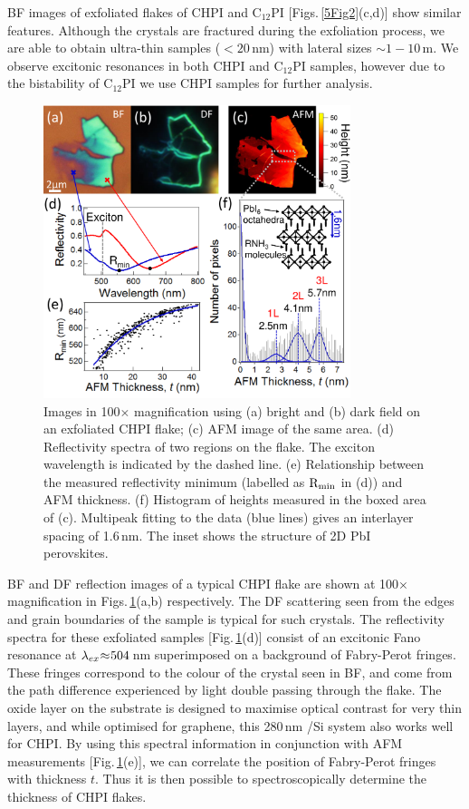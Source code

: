 BF images of exfoliated flakes of CHPI and C$_{12}$PI [Figs.\,\ref{5Fig2}(c,d)] show similar features. Although the crystals are fractured during the exfoliation process, we are able to obtain ultra-thin samples ($<20$\,nm) with lateral sizes $\sim1-10\,$\textmu m. We observe excitonic resonances in both CHPI and C$_{12}$PI samples, however due to the bistability of C$_{12}$PI we use CHPI samples for further analysis.
\begin{figure}[h!]
\centering
\includegraphics[width=0.8\textwidth]{Fig3}
\caption{Images in 100$\times$ magnification using (a) bright and (b) dark field on an exfoliated CHPI flake; (c) AFM image of the same area. (d) Reflectivity spectra of two regions on the flake. The exciton wavelength is indicated by the dashed line. (e) Relationship between the measured reflectivity minimum (labelled as $\textnormal{R}_\textnormal{min}$ in (d)) and AFM thickness. (f) Histogram of heights measured in the boxed area of (c). Multipeak fitting to the data (blue lines) gives an interlayer spacing of 1.6\,nm. The inset shows the structure of 2D PbI perovskites.}
\label{5Fig3}
\end{figure}

BF and DF reflection images of a typical CHPI flake are shown at 100$\times$ magnification in Figs.\,\ref{5Fig3}(a,b) respectively. The DF scattering seen from the edges and grain boundaries of the sample is typical for such crystals. The reflectivity spectra for these exfoliated samples [Fig.\,\ref{5Fig3}(d)] consist of an excitonic Fano resonance at $\lambda_{ex}\negmedspace\approx\negmedspace504$\,nm superimposed on a background of Fabry-Perot fringes. These fringes correspond to the colour of the crystal seen in BF, and come from the path difference experienced by light double passing through the flake. The oxide layer on the substrate is designed to maximise optical contrast for very thin layers, and while optimised for graphene, this 280\,nm /Si system also works well for CHPI. By using this spectral information in conjunction with AFM measurements [Fig.\,\ref{5Fig3}(e)], we can correlate the position of Fabry-Perot fringes with thickness $t$. Thus it is then possible to spectroscopically determine the thickness of CHPI flakes.

